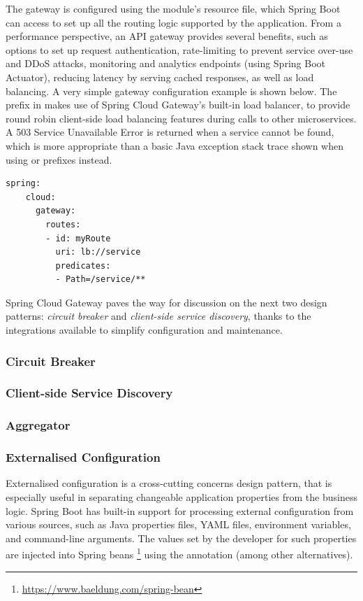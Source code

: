 The gateway is configured using the module's  resource file, which Spring Boot can access to set up all the routing logic supported by the application. From a performance perspective, an API gateway provides several benefits, such as options to set up request authentication, rate-limiting to prevent service over-use and DDoS attacks, monitoring and analytics endpoints (using Spring Boot Actuator), reducing latency by serving cached responses, as well as load balancing. A very simple gateway configuration example is shown below. The  prefix in  makes use of Spring Cloud Gateway's built-in load balancer, to provide round robin client-side load balancing features during calls to other microservices. A 503 Service Unavailable Error is returned when a service cannot be found, which is more appropriate than a basic Java exception stack trace shown when using  or  prefixes instead.

\begin{lstlisting}[caption=Sample Spring Cloud Gateway configuration]
  spring:
    cloud:
      gateway:
        routes:
        - id: myRoute
          uri: lb://service
          predicates:
          - Path=/service/**
\end{lstlisting}

Spring Cloud Gateway paves the way for discussion on the next two design patterns: \textit{circuit breaker} and \textit{client-side service discovery}, thanks to the integrations available to simplify configuration and maintenance.


\subsubsection{Circuit Breaker}

\subsubsection{Client-side Service Discovery}

\subsubsection{Aggregator}

\subsubsection{Externalised Configuration}

Externalised configuration is a cross-cutting concerns design pattern, that is especially useful in separating changeable application properties from the business logic. Spring Boot has built-in support for processing external configuration from various sources, such as Java properties files, YAML files, environment variables, and command-line arguments. The values set by the developer for such properties are injected into Spring beans \footnote{\url{https://www.baeldung.com/spring-bean}} using the  annotation (among other alternatives).


